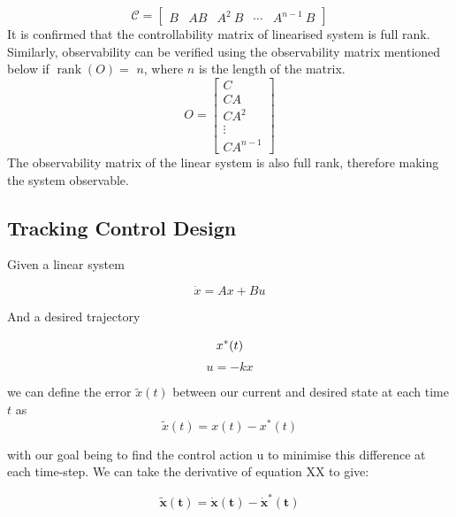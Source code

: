 \documentclass{UoNMCHA}
\numberwithin{equation}{section}
\begin{document}
	$$
	\mathcal{C}=\left[\begin{array}{lllll}
	{B} & {AB} & {A}^{2} {~B} & \cdots & {A}^{{n}-1} {~B}
	\end{array}\right]
	$$
	It is confirmed that the controllability matrix of linearised system is full rank.
	Similarly, observability can be verified using the observability matrix mentioned below if $\operatorname{rank}(O)=$
	${n}$, where ${n}$ is the length of the matrix.
	$$
	O=\left[\begin{array}{c}
	{C} \\
	{CA} \\
	{CA}^{2} \\
	\vdots \\
	{CA}^{{n}-1}
	\end{array}\right]
	$$
	The observability matrix of the linear system is also full rank, therefore making the system observable.
	
	\newpage
	\subsection{Tracking Control Design}\label{Tracking Control Design}
	
	Given a linear system
	
	\begin{equation}
	\dot{x}=A x+B u
	\end{equation}
		
	And a desired trajectory

		\begin{equation}
	x^{*}(t) \\
	\end{equation}
		\begin{equation}
	u=-k x
	\end{equation}

	we can define the error $\tilde{x}(t)$ between our current and desired state at each time $t$ as
	\begin{equation}
		\tilde{x}(t)=x(t)-x^{*}(t)
	\end{equation}

	with our goal being to find the control action u to minimise this difference at each time-step.
	We can take the derivative of equation XX to give:
	
	\begin{equation}
	\tilde{\boldsymbol{x}}(\boldsymbol{t})=\dot{\boldsymbol{x}}(\boldsymbol{t})-\dot{\boldsymbol{x}}^{*}(\boldsymbol{t})
	\end{equation}
\end{document}
